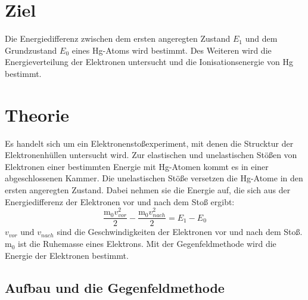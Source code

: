 \section{Ziel}
\label{Ziel}

Die Energiedifferenz zwischen dem ersten angeregten Zustand $E_1$ und dem Grundzustand $E_0$ eines Hg-Atoms wird bestimmt.
Des Weiteren wird die Energieverteilung der Elektronen untersucht und die Ionisationsenergie von Hg bestimmt.

\section{Theorie}
\label{sec:Theorie}

Es handelt sich um ein Elektronenstoßexperiment, mit denen die Strucktur der Elektronenhüllen untersucht wird.
Zur elastischen und unelastischen Stößen von Elektronen einer bestimmten Energie mit Hg-Atomen kommt es in einer abgeschlossenen Kammer.
Die unelastischen Stöße versetzen die Hg-Atome in den ersten angeregten Zustand.
Dabei nehmen sie die Energie auf, die sich aus der Energiedifferenz der Elektronen vor und nach dem Stoß ergibt:
\begin{equation}
    \frac{\text{m}_0 v_{vor}^2}{2} - \frac{\text{m}_0 v_{nach}^2}{2} = E_1 - E_0
    \label{eqn:gl1}
\end{equation}
$v_{vor} \text{ und } v_{nach}$ sind die Geschwindigkeiten der Elektronen vor und nach dem Stoß.
$\text{m}_0$ ist die Ruhemasse eines Elektrons.
Mit der Gegenfeldmethode wird die Energie der Elektronen bestimmt.

\subsection{Aufbau und die Gegenfeldmethode}
\label{Aufbau}


